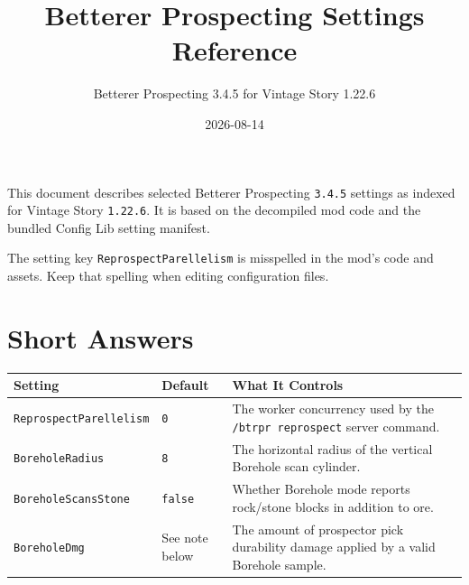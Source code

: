 \documentclass[
  11pt,
  letterpaper,
  titlepage]{article}
\title{Betterer Prospecting Settings Reference}
\subtitle{Betterer Prospecting 3.4.5 for Vintage Story 1.22.6}
\author{}
\date{2026-08-14}
\newcounter{none} %
\begin{document}
\maketitle

{
\hypersetup{linkcolor=black}
\setcounter{tocdepth}{2}
\tableofcontents
}
This document describes selected Betterer Prospecting \texttt{3.4.5}
settings as indexed for Vintage Story \texttt{1.22.6}. It is based on
the decompiled mod code and the bundled Config Lib setting manifest.

The setting key \texttt{ReprospectParellelism} is misspelled in the
mod's code and assets. Keep that spelling when editing configuration
files.

\section{Short Answers}\label{short-answers}

{\def\LTcaptype{none} %
\begin{longtable}[]{@{}
  >{\raggedright\arraybackslash}p{}
  >{\raggedright\arraybackslash}p{}
  >{\raggedright\arraybackslash}p{}@{}}
\toprule\noalign{}
\begin{minipage}[b]{\linewidth}\raggedright
Setting
\end{minipage} & \begin{minipage}[b]{\linewidth}\raggedright
Default
\end{minipage} & \begin{minipage}[b]{\linewidth}\raggedright
What It Controls
\end{minipage} \\
\midrule\noalign{}
\endhead
\bottomrule\noalign{}
\endlastfoot
\texttt{ReprospectParellelism} & \texttt{0} & The worker concurrency
used by the \texttt{/btrpr\ reprospect} server command. \\
\texttt{BoreholeRadius} & \texttt{8} & The horizontal radius of the
vertical Borehole scan cylinder. \\
\texttt{BoreholeScansStone} & \texttt{false} & Whether Borehole mode
reports rock/stone blocks in addition to ore. \\
\texttt{BoreholeDmg} & See note below & The amount of prospector pick
durability damage applied by a valid Borehole sample. \\
\end{longtable}
}
\end{document}
